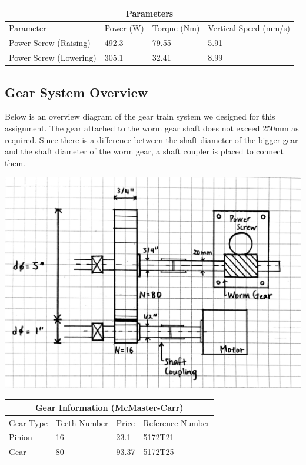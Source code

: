 \documentclass[letterpaper,12pt]{article}
\begin{document}
\begin{center}
	\begin{tabular}{ |p{4.5cm}||p{2cm}|p{2.5cm}|p{4cm}|  }
		\hline
		\multicolumn{4}{|c|}{Parameters} \\
		\hline
		Parameter & Power (W) & Torque (Nm) & Vertical Speed (mm/s) \\
		\hline
		Power Screw (Raising) & 492.3 & 79.55 & 5.91 \\
		Power Screw (Lowering) & 305.1 & 32.41 & 8.99 \\
		\hline
	\end{tabular}
\end{center}

\subsection{Gear System Overview}
Below is an overview diagram of the gear train system we designed for this assignment. The gear attached to the worm gear shaft does not exceed 250mm as required. Since there is a difference between the shaft diameter of the bigger gear and the shaft diameter of the worm gear, a shaft coupler is placed to connect them.
\begin{center}
\includegraphics[width=16cm]{MECH325A1System}
\end{center}

\begin{center}
	\begin{tabular}{ |p{2cm}||p{3cm}|p{3cm}|p{4cm}|  }
		\hline
		\multicolumn{4}{|c|}{Gear Information (McMaster-Carr)} \\
		\hline
		Gear Type & Teeth Number & Price & Reference Number \\
		\hline
		Pinion & 16 & 23.1 & 5172T21 \\
		Gear & 80 & 93.37 & 5172T25 \\
		\hline
	\end{tabular}
\end{center}
\end{document}
